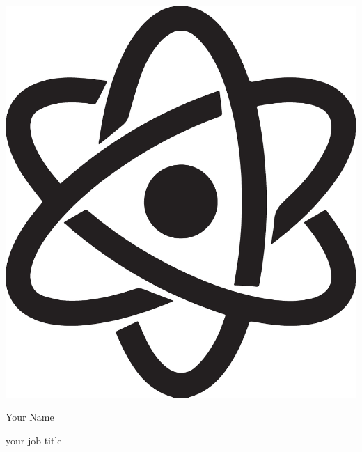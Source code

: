 \documentclass[11pt,oneside,a4paper]{article}
\begin{document}
\begin{minipage}[t]{0.20\textwidth}
    \strut\vspace*{-\baselineskip}\newline\hspace*{0.54\textwidth}\includegraphics[scale=0.060]{header/atom.png}
\end{minipage}
\begin{minipage}[t]{0.80\textwidth}
    \strut\vspace*{-\baselineskip}\newline\hspace*{0.14\textwidth}
    \Huge{Your Name}

    \vspace*{0.30cm}
    \strut\vspace*{-\baselineskip}\newline\hspace*{0.14\textwidth}
    \LARGE{your job title}
\end{minipage}
\end{document}

